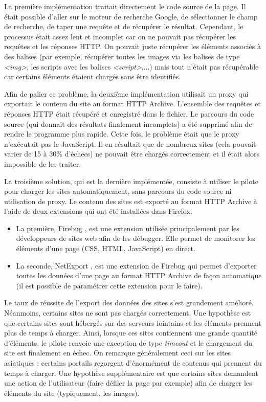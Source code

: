 La première implémentation traitait directement le code source de la page. Il était possible d'aller sur le moteur de recherche Google, de sélectionner le champ de recherche, de taper une requête et de récupérer le résultat. Cependant, le processus était assez lent et incomplet car on ne pouvait pas récupérer les requêtes et les réponses HTTP. On pouvait juste récupérer les éléments associés à des balises (par exemple, récupérer toutes les images via les balises de type \textit{<img>}, les scripts avec les balises \textit{<script>},...) mais tout n'était pas récupérable car certains éléments étaient chargés sans être identifiés.

Afin de palier ce problème, la deuxième implémentation utilisait un proxy qui exportait le contenu du site au format HTTP Archive. L'ensemble des requêtes et réponses HTTP était récupéré et enregistré dans le fichier. Le parcours du code source (qui donnait des résultats finalement incomplets) a été supprimé afin de rendre le programme plus rapide. Cette fois, le problème était que le proxy n'exécutait pas le JavaScript. Il en résultait que de nombreux sites (cela pouvait varier de 15 à 30\% d'échecs) ne pouvait être chargés correctement et il était alors impossible de les traiter.

La troisième solution, qui est la dernière implémentée, consiste à utiliser le pilote pour charger les sites automatiquement, sans parcours du code source ni utilisation de proxy. Le contenu des sites est exporté au format HTTP Archive à l'aide de deux extensions qui ont été installées dans Firefox.
\begin{itemize}
	\item La première, Firebug \cite{firebug_homepage}, est une extension utilisée principalement par les développeurs de sites web afin de les débugger. Elle permet de monitorer les éléments d'une page (CSS, HTML, JavaScript) en direct.
	\item La seconde, NetExport \cite{netexport_homepage}, est une extension de Firebug qui permet d'exporter toutes les données d'une page au format HTTP Archive de façon automatique (il est possible de paramétrer cette extension pour le faire).
\end{itemize}

Le taux de réussite de l'export des données des sites s'est grandement amélioré. Néanmoins, certains sites ne sont pas chargés correctement.
Une hypothèse est que certains sites sont hébergés sur des serveurs lointains et les éléments prennent plus de temps à charger. Ainsi, lorsque ces sites contiennent une grande quantité d'éléments, le pilote renvoie une exception de type \textit{timeout} et le chargement du site est finalement en échec. On remarque généralement ceci sur les sites asiatiques : certains portails regorgent d'énormément de contenus qui prennent du temps à charger.
Une hypothèse supplémentaire est que certains sites demandent une action de l'utilisateur (faire défiler la page par exemple) afin de charger les éléments du site (typiquement, les images).

